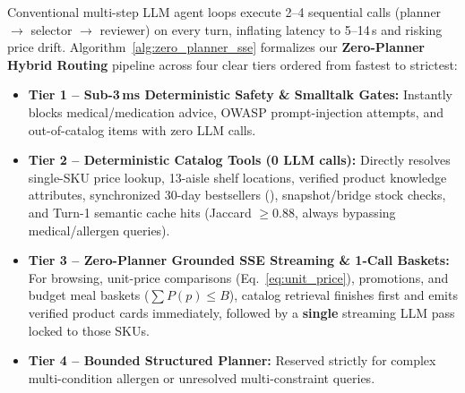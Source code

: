 Conventional multi-step LLM agent loops execute 2--4 sequential calls (planner $\to$ selector $\to$ reviewer) on every turn, inflating latency to 5--14\,s and risking price drift. Algorithm~\ref{alg:zero_planner_sse} formalizes our \textbf{Zero-Planner Hybrid Routing} pipeline across four clear tiers ordered from fastest to strictest:
\begin{itemize}
    \item \textbf{Tier 1 -- Sub-3\,ms Deterministic Safety \& Smalltalk Gates:} Instantly blocks medical/medication advice, OWASP prompt-injection attempts, and out-of-catalog items with zero LLM calls.
    \item \textbf{Tier 2 -- Deterministic Catalog Tools (0 LLM calls):} Directly resolves single-SKU price lookup, 13-aisle shelf locations, verified product knowledge attributes, synchronized 30-day bestsellers (), snapshot/bridge stock checks, and Turn-1 semantic cache hits (Jaccard $\ge 0.88$, always bypassing medical/allergen queries).
    \item \textbf{Tier 3 -- Zero-Planner Grounded SSE Streaming \& 1-Call Baskets:} For browsing, unit-price comparisons (Eq.~\ref{eq:unit_price}), promotions, and budget meal baskets ($\sum P(p) \le B$), catalog retrieval finishes first and emits verified product cards immediately, followed by a \textbf{single} streaming LLM pass locked to those SKUs.
    \item \textbf{Tier 4 -- Bounded Structured Planner:} Reserved strictly for complex multi-condition allergen or unresolved multi-constraint queries.
\end{itemize}


